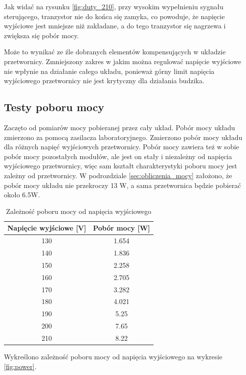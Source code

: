 \documentclass[../main.tex]{subfiles}
\begin{document}
Jak widać na rysunku \ref{fig:duty_210}, przy wysokim wypełnieniu sygnału sterującego,
tranzystor nie do końca się zamyka, co powoduje, że napięcie wyjściowe jest mniejsze niż zakładane, 
a do tego tranzystor się nagrzewa i zwiększa się pobór mocy.

Może to wynikać ze źle dobranych elementów kompensujących w układzie przetwornicy.
Zmniejszony zakres w jakim można regulować napięcie wyjściowe nie wpłynie na działanie całego układu,
ponieważ górny limit napięcia wyjściowego przetwornicy nie jest krytyczny dla działania budzika.

\subsection{Testy poboru mocy}
Zaczęto od pomiarów mocy pobieranej przez cały układ. Pobór mocy układu zmierzono za pomocą zasilacza laboratoryjnego.
Zmierzono pobór mocy układu dla różnych napięć wyjściowych przetwornicy. Pobór mocy zawiera też w sobie pobór mocy pozostałych modułów,
ale jest on stały i niezależny od napięcia wyjściowego przetwornicy, więc sam kształt charakterystyki poboru mocy jest zależny od przetwornicy.
W podrozdziale \ref{sec:obliczenia_mocy} założono, że pobór mocy układu nie przekroczy 13 W, a sama przetwornica będzie pobierać około 6.5W.

\begin{table}[H]
    \centering
    \begin{tabular}{|c|c|}
        \hline
        Napięcie wyjściowe [V] & Pobór mocy [W] \\
        \hline
        130 & 1.654 \\
        140 & 1.836 \\
        150 & 2.258 \\
        160 & 2.705 \\
        170 & 3.282 \\
        180 & 4.021 \\
        190 & 5.25 \\
        200 & 7.65 \\
        210 & 8.22 \\
        \hline
    \end{tabular}
    \caption{Zależność poboru mocy od napięcia wyjściowego}
\end{table}

Wykreślono zależność poboru mocy od napięcia wyjściowego na wykresie \ref{fig:power}.
\end{document}
